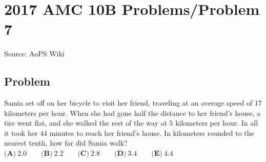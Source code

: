\documentclass[12pt]{article}
\begin{document}
\section*{{2017 AMC 10B Problems/Problem 7}}
Source: AoPS Wiki

\subsection*{Problem}
Samia set off on her bicycle to visit her friend, traveling at an average speed of $17$ kilometers per hour. When she had gone half the distance to her friend's house, a tire went flat, and she walked the rest of the way at $5$ kilometers per hour. In all it took her $44$ minutes to reach her friend's house. In kilometers rounded to the nearest tenth, how far did Samia walk? $\textbf{(A)}\ 2.0\qquad\textbf{(B)}\ 2.2\qquad\textbf{(C)}\ 2.8\qquad\textbf{(D)}\ 3.4\qquad\textbf{(E)}\ 4.4$
\end{document}
